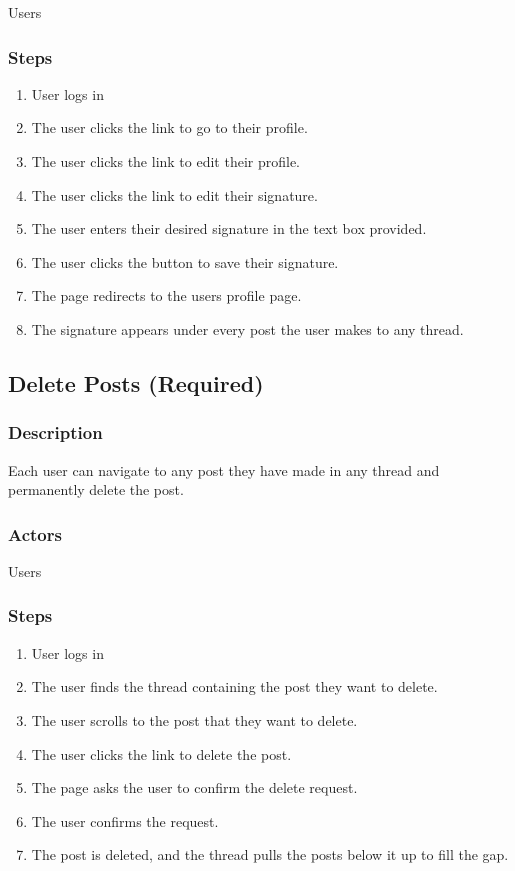 \documentclass[12pt]{scrartcl}
\begin{document}
Users

\subsubsection{Steps}

\begin{enumerate}
\item User logs in
\item The user clicks the link to go to their profile.
\item The user clicks the link to edit their profile.
\item The user clicks the link to edit their signature.
\item The user enters their desired signature in the text box provided.
\item The user clicks the button to save their signature.
\item The page redirects to the users profile page.
\item The signature appears under every post the user makes to any thread.
\end{enumerate}

\subsection{Delete Posts (Required)}
\subsubsection{Description}

Each user can navigate to any post they have made in any thread and permanently delete the post.

\subsubsection{Actors}

Users

\subsubsection{Steps}

\begin{enumerate}
\item User logs in
\item The user finds the thread containing the post they want to delete.
\item The user scrolls to the post that they want to delete.
\item The user clicks the link to delete the post.
\item The page asks the user to confirm the delete request.
\item The user confirms the request.
\item The post is deleted, and the thread pulls the posts below it up to fill the gap.
\end{enumerate}
\end{document}
